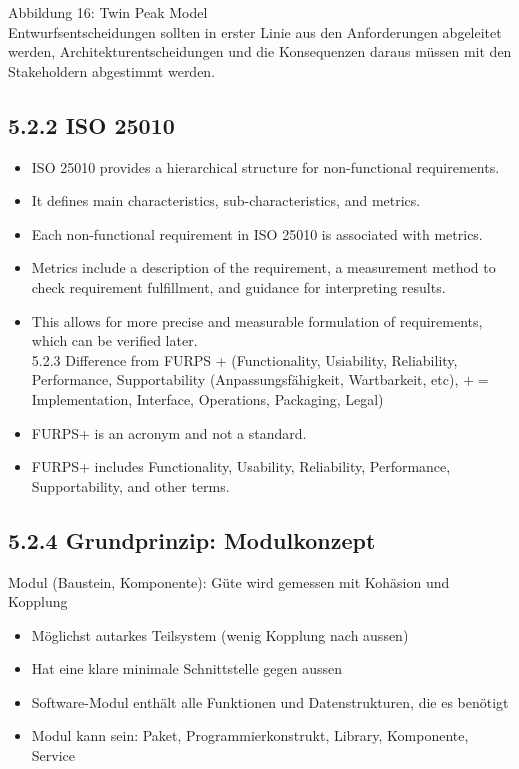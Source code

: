 \documentclass[10pt]{article}
\begin{document}
Abbildung 16: Twin Peak Model\\
Entwurfsentscheidungen sollten in erster Linie aus den Anforderungen abgeleitet werden, Architekturentscheidungen und die Konsequenzen daraus müssen mit den Stakeholdern abgestimmt werden.

\subsection*{5.2.2 ISO 25010}
\begin{itemize}
  \item ISO 25010 provides a hierarchical structure for non-functional requirements.
  \item It defines main characteristics, sub-characteristics, and metrics.
  \item Each non-functional requirement in ISO 25010 is associated with metrics.
  \item Metrics include a description of the requirement, a measurement method to check requirement fulfillment, and guidance for interpreting results.
  \item This allows for more precise and measurable formulation of requirements, which can be verified later.\\
5.2.3 Difference from FURPS + (Functionality, Usiability, Reliability, Performance, Supportability (Anpassungsfähigkeit, Wartbarkeit, etc), $+=$ Implementation, Interface, Operations, Packaging, Legal)
  \item FURPS+ is an acronym and not a standard.
  \item FURPS+ includes Functionality, Usability, Reliability, Performance, Supportability, and other terms.
\end{itemize}

\subsection*{5.2.4 Grundprinzip: Modulkonzept}
Modul (Baustein, Komponente): Güte wird gemessen mit Kohäsion und Kopplung

\begin{itemize}
  \item Möglichst autarkes Teilsystem (wenig Kopplung nach aussen)
  \item Hat eine klare minimale Schnittstelle gegen aussen
  \item Software-Modul enthält alle Funktionen und Datenstrukturen, die es benötigt
  \item Modul kann sein: Paket, Programmierkonstrukt, Library, Komponente, Service
\end{itemize}
\end{document}
